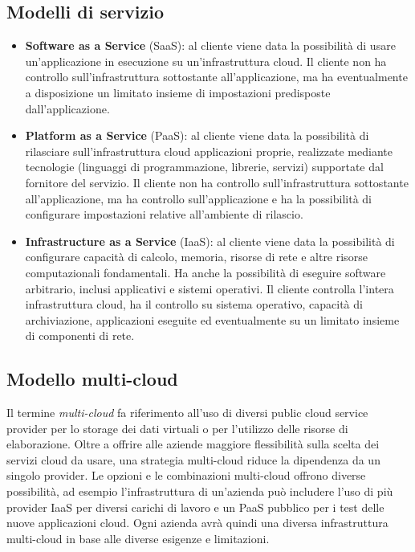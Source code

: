 \documentclass[a4paper]{article}
\begin{document}
\subsection{Modelli di servizio}
\begin{itemize}
    \item{\textbf{Software  as  a  Service}  (SaaS)}: al cliente viene data la possibilità di usare un'applicazione in esecuzione su un'infrastruttura cloud. Il cliente non ha controllo sull'infrastruttura sottostante all'applicazione, ma ha eventualmente a disposizione un limitato insieme di impostazioni predisposte dall'applicazione.
    
    \item{\textbf{Platform as a Service} (PaaS)}: al cliente viene data la possibilità di rilasciare sull'infrastruttura cloud applicazioni proprie, realizzate mediante tecnologie (linguaggi di programmazione, librerie, servizi) supportate dal fornitore del servizio. Il cliente non ha controllo sull'infrastruttura sottostante all'applicazione, ma ha controllo sull'applicazione e ha la possibilità di configurare impostazioni relative all'ambiente di rilascio.
    
    \item{\textbf{Infrastructure  as  a  Service}  (IaaS)}: al cliente viene data la possibilità di configurare capacità di calcolo, memoria, risorse di rete e altre risorse computazionali fondamentali. Ha anche la possibilità di eseguire software arbitrario, inclusi applicativi e sistemi operativi. Il cliente controlla l'intera infrastruttura cloud, ha il controllo su sistema operativo, capacità di archiviazione, applicazioni eseguite ed eventualmente su un limitato insieme di componenti di rete.\cite{cloud_computing}
\end{itemize}

\subsection{Modello multi-cloud}
Il termine \textit{multi-cloud} fa riferimento all'uso di diversi public cloud service provider per lo storage dei dati virtuali o per l'utilizzo delle risorse di elaborazione. Oltre a offrire alle aziende maggiore flessibilità sulla scelta dei servizi cloud da usare, una strategia multi-cloud riduce la dipendenza da un singolo provider. Le opzioni e le combinazioni multi-cloud offrono diverse possibilità, ad esempio l'infrastruttura di un'azienda può includere l'uso di più provider IaaS per diversi carichi di lavoro e un PaaS pubblico per i test delle nuove applicazioni cloud. Ogni azienda avrà quindi una diversa infrastruttura multi-cloud in base alle diverse esigenze e limitazioni.\cite{multicloud}
\end{document}
